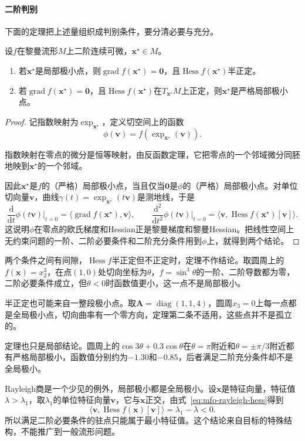 \paragraph{二阶判别}
下面的定理把上述量组织成判别条件，要分清必要与充分。

\begin{theorem}[流形上的最优性条件]
 \label{thm:mfo-optimality}
 设$f$在黎曼流形$M$上二阶连续可微，$\bm{x}^\star\in M$。
 \begin{enumerate}
  \item 若$\bm{x}^\star$是局部极小点，则$\operatorname{grad}f(\bm{x}^\star)=\bm{0}$，且$\operatorname{Hess}f(\bm{x}^\star)$半正定。
  \item 若$\operatorname{grad}f(\bm{x}^\star)=\bm{0}$，且$\operatorname{Hess}f(\bm{x}^\star)$在$T_{\bm{x}^\star}M$上正定，则$\bm{x}^\star$是严格局部极小点。
 \end{enumerate}
\end{theorem}

\begin{proof}
 记指数映射为$\exp_{\bm{x}^\star}$，定义切空间上的函数
 \[
  \phi(\bm{v})=f(\exp_{\bm{x}^\star}(\bm{v})).
 \]

 指数映射在零点的微分是恒等映射，由反函数定理，它把零点的一个邻域微分同胚地映到$\bm{x}^\star$的一个邻域。

 因此$\bm{x}^\star$是$f$的（严格）局部极小点，当且仅当$\bm{0}$是$\phi$的（严格）局部极小点。对单位切向量$\bm{v}$，曲线$\gamma(t)=\exp_{\bm{x}^\star}(t\bm{v})$是测地线，于是
 \[
  \frac{\mathrm{d}}{\mathrm{d}t}\phi(t\bm{v})\Big|_{t=0}=\langle\operatorname{grad}f(\bm{x}^\star),\bm{v}\rangle,
  \qquad
  \frac{\mathrm{d}^2}{\mathrm{d}t^2}\phi(t\bm{v})\Big|_{t=0}=\langle\bm{v},\operatorname{Hess}f(\bm{x}^\star)[\bm{v}]\rangle.
 \]
 这说明$\phi$在零点的欧氏梯度和Hessian正是黎曼梯度和黎曼Hessian。把线性空间上无约束问题的一阶、二阶必要条件和二阶充分条件用到$\phi$上，就得到两个结论。
\end{proof}

两个条件之间有间隙，$\operatorname{Hess}f$半正定但不正定时，定理不作结论。取圆周上的$f(\bm{x})=x_2^3$，在点$(1,0)$处切向坐标为$\theta$，$f=\sin^3\theta$的一阶、二阶导数都为零，二阶必要条件成立，但$\theta<0$时函数值更小，这一点不是局部极小。

半正定也可能来自一整段极小点。取$\bm{A}=\operatorname{diag}(1,1,4)$，圆周$x_3=0$上每一点都是全局极小点，切向曲率有一个零方向，定理第二条不适用，这些点并不是孤立的。

定理也只是局部结论。圆周上的$\cos3\theta+0.3\cos\theta$在$\theta=\pi$附近和$\theta=\pm\pi/3$附近都有严格局部极小，函数值分别约为$-1.30$和$-0.85$，后者满足二阶充分条件却不是全局极小。

Rayleigh商是一个少见的例外，局部极小都是全局极小。设$\bm{x}$是特征向量，特征值$\lambda>\lambda_1$，取$\lambda_1$的单位特征向量$\bm{v}$，它与$\bm{x}$正交，由式~\eqref{eq:mfo-rayleigh-hess}得到
\[
 \langle\bm{v},\operatorname{Hess}f(\bm{x})[\bm{v}]\rangle=\lambda_1-\lambda<0.
\]
所以满足二阶必要条件的驻点只能属于最小特征值。这个结论来自目标的特殊结构，不能推广到一般流形问题。
